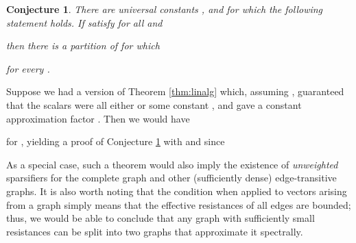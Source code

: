\documentclass[12pt]{article}
\newtheorem{conjecture}[theorem]{Conjecture}
\begin{document}
\begin{conjecture} \label{conj:ks} There are universal constants 
, and  for which the following
statement holds. If 
satisfy  for all  and

  then there is a partition  of  for which

  for every .
\end{conjecture}

Suppose we had a version of Theorem \ref{thm:linalg} which, assuming 
, guaranteed that the
  scalars  were all either  or some constant , and 
  gave a constant approximation factor .
Then we would have

 for , yielding
a proof of Conjecture \ref{conj:ks} with 
     and  since
    
    

As a special case, such a theorem would also imply the existence of {\em unweighted} sparsifiers
  for the complete graph and other (sufficiently dense) edge-transitive graphs. 
It is also worth noting that the  condition when applied to vectors  arising from a graph 
  simply means that the effective resistances
  of all edges are bounded; thus, we would be able to conclude that any graph with sufficiently small resistances
  can be split into two graphs that approximate it spectrally.
\end{document}
